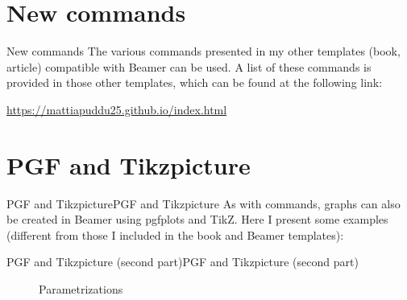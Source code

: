 
\section{New commands}
\begin{frame}[fragile]{New commands}
The various commands presented in my other templates (book, article) compatible with Beamer can be used. A list of these commands is provided in those other templates, which can be found at the following link:

\vspace{.5cm}\url{https://mattiapuddu25.github.io/index.html}
\end{frame}

\section{PGF and Tikzpicture}

\begin{frame}[fragile]{PGF and Tikzpicture}{PGF and Tikzpicture}
As with commands, graphs can also be created in Beamer using pgfplots and TikZ. Here I present some examples (different from those I included in the book and Beamer templates):
\end{frame}

\begin{frame}[fragile]{PGF and Tikzpicture (second part)}{PGF and Tikzpicture (second part)}
\begin{figure}[ht]
\centering
{}
\caption{Parametrizations}
\end{figure}
\end{frame}





